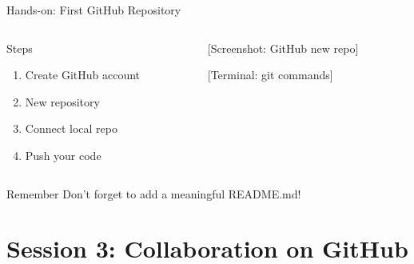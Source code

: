 \documentclass[aspectratio=169]{beamer}
\begin{document}
\begin{frame}{Hands-on: First GitHub Repository}
  \begin{columns}
    \begin{column}{0.48\textwidth}
      \begin{block}{Steps}
        \begin{enumerate}
          \item Create GitHub account
          \item New repository
          \item Connect local repo
          \item Push your code
        \end{enumerate}
      \end{block}
    \end{column}
    
    \begin{column}{0.48\textwidth}
      \begin{center}
        [Screenshot: GitHub new repo]
        
        \vspace{1em}
        [Terminal: git commands]
      \end{center}
    \end{column}
  \end{columns}
  
  \vspace{1em}
  \begin{alertblock}{Remember}
    Don't forget to add a meaningful README.md!
  \end{alertblock}
\end{frame}

\section{Session 3: Collaboration on GitHub}
\end{document}
